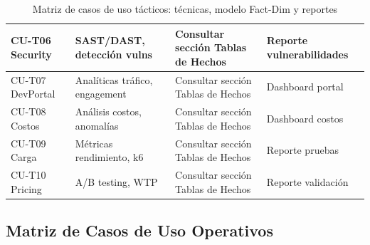 ﻿\documentclass[11pt, letterpaper]{article}
\begin{document}
\begin{table}[H]
\begin{tabularx}{\linewidth}{>{\raggedright\arraybackslash}p{2cm} >{\raggedright\arraybackslash}p{3.5cm} >{\raggedright\arraybackslash}p{3.5cm} >{\raggedright\arraybackslash}X}
CU-T06 Security & SAST/DAST, detección vulns & Consultar sección Tablas de Hechos & Reporte vulnerabilidades \\

\midrule

CU-T07 DevPortal & Analíticas tráfico, engagement & Consultar sección Tablas de Hechos & Dashboard portal \\

\midrule

CU-T08 Costos & Análisis costos, anomalías & Consultar sección Tablas de Hechos & Dashboard costos \\

\midrule

CU-T09 Carga & Métricas rendimiento, k6 & Consultar sección Tablas de Hechos & Reporte pruebas \\

\midrule

CU-T10 Pricing & A/B testing, WTP & Consultar sección Tablas de Hechos & Reporte validación \\

\bottomrule

\end{tabularx}

\caption{Matriz de casos de uso tácticos: técnicas, modelo Fact-Dim y reportes}

\end{table}




\subsection{Matriz de Casos de Uso Operativos}
\end{document}
